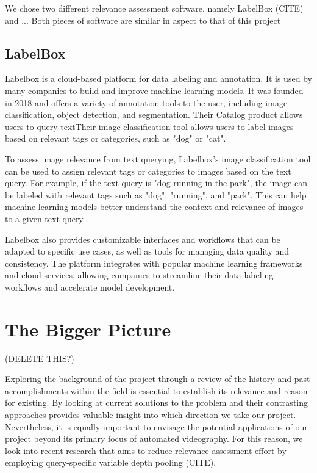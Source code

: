 \documentclass{l4proj}
\begin{document}
We chose two different relevance assessment software, namely LabelBox \cite{labelbox} (CITE) and ... Both pieces of software are similar in aspect to that of this project

\subsection{LabelBox}
Labelbox is a cloud-based platform for data labeling and annotation. It is used by many companies to build and improve machine learning models. It was founded in 2018 and offers a variety of annotation tools to the user, including image classification, object detection, and segmentation. Their Catalog product allows users to query textTheir image classification tool allows users to label images based on relevant tags or categories, such as "dog" or "cat".

To assess image relevance from text querying, Labelbox's image classification tool can be used to assign relevant tags or categories to images based on the text query. For example, if the text query is "dog running in the park", the image can be labeled with relevant tags such as "dog", "running", and "park". This can help machine learning models better understand the context and relevance of images to a given text query.

Labelbox also provides customizable interfaces and workflows that can be adapted to specific use cases, as well as tools for managing data quality and consistency. The platform integrates with popular machine learning frameworks and cloud services, allowing companies to streamline their data labeling workflows and accelerate model development.


\section{The Bigger Picture}
(DELETE THIS?)

Exploring the background of the project through a review of the history and past accomplishments within the field is essential to establish its relevance and reason for existing. By looking at current solutions to the problem and their contrasting approaches provides valuable insight into which direction we take our project. Nevertheless, it is equally important to envisage the potential applications of our project beyond its primary focus of automated videography. For this reason, we look into recent research that aims to reduce relevance assessment effort by employing query-specific variable depth pooling (CITE).
\end{document}
